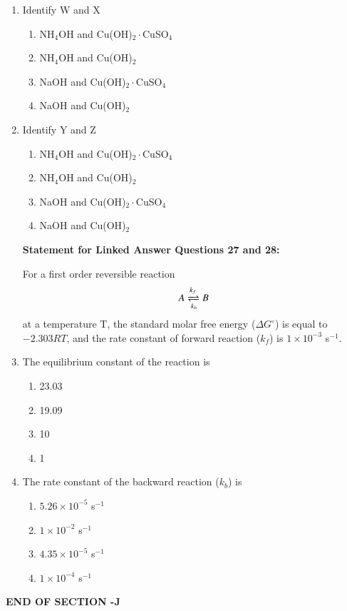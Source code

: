 \documentclass[journal,12pt,onecolumn]{IEEEtran}
\begin{document}
\begin{enumerate}
\item Identify W and X
\begin{multicols}{2}
\begin{enumerate}[label=(\Alph*)]
\item NH$_4$OH and Cu(OH)$_2\cdot$CuSO$_4$
\item NH$_4$OH and Cu(OH)$_2$
\item NaOH and Cu(OH)$_2\cdot$CuSO$_4$
\item NaOH and Cu(OH)$_2$
\end{enumerate}
\end{multicols}

\item Identify Y and Z
\begin{multicols}{2}
\begin{enumerate}[label=(\Alph*)]
\item NH$_4$OH and Cu(OH)$_2\cdot$CuSO$_4$
\item NH$_4$OH and Cu(OH)$_2$
\item NaOH and Cu(OH)$_2\cdot$CuSO$_4$
\item NaOH and Cu(OH)$_2$
\end{enumerate}
\end{multicols}


\noindent \textbf{Statement for Linked Answer Questions 27 and 28:} 

For a first order reversible reaction
\[
A \xrightleftharpoons[k_b]{k_f} B
\]
at a temperature T, the standard molar free energy ($\Delta G^\circ$) is equal to $-2.303RT$, and the rate constant of forward reaction ($k_f$) is $1 \times 10^{-3}$ s$^{-1}$.

\item The equilibrium constant of the reaction is
\begin{multicols}{4}
\begin{enumerate}[label=(\Alph*)]
\item 23.03
\item 19.09
\item 10
\item 1
\end{enumerate}
\end{multicols}

\item The rate constant of the backward reaction ($k_b$) is
\begin{multicols}{4}
\begin{enumerate}[label=(\Alph*)]
\item $5.26 \times 10^{-5}$ s$^{-1}$
\item $1 \times 10^{-2}$ s$^{-1}$
\item $4.35 \times 10^{-5}$ s$^{-1}$
\item $1 \times 10^{-4}$ s$^{-1}$
\end{enumerate}
\end{multicols}
\end{enumerate}
\begin{center}
    \textbf{END OF SECTION -J}
\end{center}
\newpage
\end{document}
